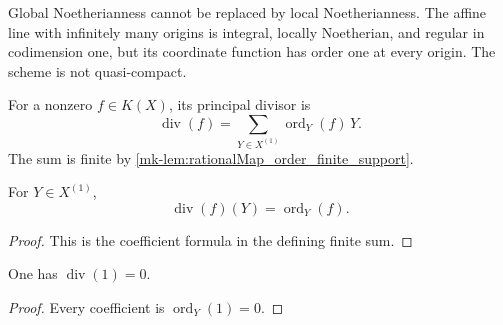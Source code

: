 \begin{remark}
  \label{mk-rem:finite_support_needs_noetherian}
  Global Noetherianness cannot be replaced by local Noetherianness.  The
  affine line with infinitely many origins is integral, locally Noetherian,
  and regular in codimension one, but its coordinate function has order one
  at every origin.  The scheme is not quasi-compact.
\end{remark}

\begin{definition}
  \label{mk-def:principal_divisor}
  \leanok


  For a nonzero \(f\in K(X)\), its principal divisor is
  \[
    \operatorname{div}(f)
      =\sum_{Y\in X^{(1)}}\operatorname{ord}_Y(f)\,Y.
  \]
  The sum is finite by \ref{mk-lem:rationalMap_order_finite_support}.
\end{definition}

\begin{lemma}
  \label{mk-lem:principal_apply}
  \leanok

  For \(Y\in X^{(1)}\),
  \[
    \operatorname{div}(f)(Y)=\operatorname{ord}_Y(f).
  \]
\end{lemma}
\begin{proof}
  \leanok
  This is the coefficient formula in the defining finite sum.
\end{proof}

\begin{lemma}
  \label{mk-lem:principal_one}
  \leanok

  One has \(\operatorname{div}(1)=0\).
\end{lemma}
\begin{proof}
  \leanok
  Every coefficient is \(\operatorname{ord}_Y(1)=0\).
\end{proof}

